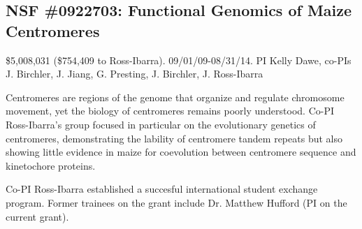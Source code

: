 \subsection*{NSF \#0922703: Functional Genomics of Maize Centromeres}
\$5,008,031 (\$754,409 to Ross-Ibarra). 09/01/09-08/31/14. PI Kelly Dawe, co-PIs J. Birchler, J. Jiang, G. Presting, J. Birchler, J. Ross-Ibarra
\par{} Centromeres are regions of the genome that organize and regulate chromosome movement, yet the biology of centromeres remains poorly understood. Co-PI Ross-Ibarra's group focused in particular on the evolutionary genetics of centromeres, demonstrating the lability of centromere tandem repeats but also showing little evidence in maize for coevolution between centromere sequence and kinetochore proteins. \par{}  Co-PI Ross-Ibarra  established a succesful international student exchange program. Former trainees on the grant include Dr. Matthew Hufford (PI on the current grant).\
\par{} \citet{Shi2010a, Chia2012a, Fang2012, Hufford2012, Hufford2012b, Hufford2013, Melters2013a, Kanizay2013, Pyhajarvi2013}